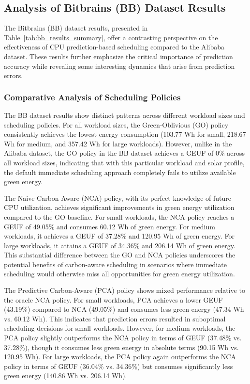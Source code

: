 \subsection{Analysis of Bitbrains (BB) Dataset Results}
\label{subsec:bb_results}

The Bitbrains (BB) dataset results, presented in Table~\ref{tab:bb_results_summary}, offer a contrasting perspective on the effectiveness of CPU prediction-based scheduling compared to the Alibaba dataset. These results further emphasize the critical importance of prediction accuracy while revealing some interesting dynamics that arise from prediction errors.

\subsubsection{Comparative Analysis of Scheduling Policies}

The BB dataset results show distinct patterns across different workload sizes and scheduling policies. For all workload sizes, the Green-Oblivious (GO) policy consistently achieves the lowest energy consumption (103.77 Wh for small, 218.67 Wh for medium, and 357.42 Wh for large workloads). However, unlike in the Alibaba dataset, the GO policy in the BB dataset achieves a GEUF of 0\% across all workload sizes, indicating that with this particular workload and solar profile, the default immediate scheduling approach completely fails to utilize available green energy.

The Naive Carbon-Aware (NCA) policy, with its perfect knowledge of future CPU utilization, achieves significant improvements in green energy utilization compared to the GO baseline. For small workloads, the NCA policy reaches a GEUF of 49.05\% and consumes 60.12 Wh of green energy. For medium workloads, it achieves a GEUF of 37.28\% and 120.95 Wh of green energy. For large workloads, it attains a GEUF of 34.36\% and 206.14 Wh of green energy. This substantial difference between the GO and NCA policies underscores the potential benefits of carbon-aware scheduling in scenarios where immediate scheduling would otherwise miss all opportunities for green energy utilization.

The Predictive Carbon-Aware (PCA) policy shows mixed performance relative to the oracle NCA policy. For small workloads, PCA achieves a lower GEUF (43.19\%) compared to NCA (49.05\%) and consumes less green energy (47.34 Wh vs. 60.12 Wh). This indicates that prediction errors resulted in suboptimal scheduling decisions for small workloads. However, for medium workloads, the PCA policy slightly outperforms the NCA policy in terms of GEUF (37.48\% vs. 37.28\%), though it consumes less green energy in absolute terms (90.15 Wh vs. 120.95 Wh). For large workloads, the PCA policy again outperforms the NCA policy in terms of GEUF (36.04\% vs. 34.36\%) but consumes significantly less green energy (140.86 Wh vs. 206.14 Wh).

